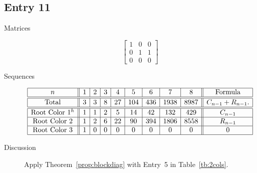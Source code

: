 \documentclass[12pt]{amsart}
\begin{document}
\subsection*{Entry 11}
\begin{description}
    \item[Matrices]
    
    \[\begin{bmatrix}
1 & 0 & 0 \\
0 & 1 & 1 \\
0 & 0 & 0
\end{bmatrix}\]
    \item[Sequences]\hspace*{\fill}\vspace{-0.5cm}
    \begin{center}
        \[
        \begin{array}{|c||c|c|c|c|c|c|c|c||c|}\hline
           n  & 1 & 2 & 3 & 4 & 5 & 6 & 7 & 8  & \text{Formula}\\\hline\hline
           \text{Total}  & 3 & 3 & 8 & 27 & 104 & 436 & 1938 & 8987 & C_{n-1}+R_{n-1}.\\\hline\hline
           \text{Root Color }1^{h} & 1 & 1 & 2 & 5 & 14 & 42 & 132 & 429 & C_{n-1}\\\hline
           \text{Root Color }2 & 1 & 2 & 6 & 22 & 90 & 394 & 1806 & 8558 & R_{n-1}\\\hline
           \text{Root Color }3 & 1 & 0 & 0 & 0 & 0 & 0 & 0 & 0 & 0\\\hline
        \end{array}
        \]
    \end{center}
    


\item[Discussion] Apply Theorem~\ref{prop:blockdiag} with Entry~5 in Table~\ref{tb:2cols}. 
    
\end{description}
\end{document}
